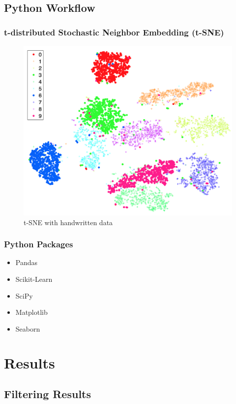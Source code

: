 \documentclass{beamer}
\begin{document}
    \subsection{Python Workflow}
    \begin{frame}
        \frametitle{t-distributed Stochastic Neighbor Embedding (t-SNE)}

        \begin{figure}[h!]
            \includegraphics[width=0.6 \linewidth]{figures/tsne.png}
            \caption{t-SNE with handwritten data \protect \cite{tsne1}}
        \end{figure}
    \end{frame}

    \begin{frame}
        \frametitle{Python Packages}

        \begin{itemize}
            \item Pandas \cite{pandas1}
            \item Scikit-Learn \cite{sklearn1}
            \item SciPy \cite{scipy1}
            \item Matplotlib \cite{matplotlib1}
            \item Seaborn \cite{seaborn1}
        \end{itemize}
    \end{frame}

    \section{Results}
    \subsection{Filtering Results}
\end{document}
